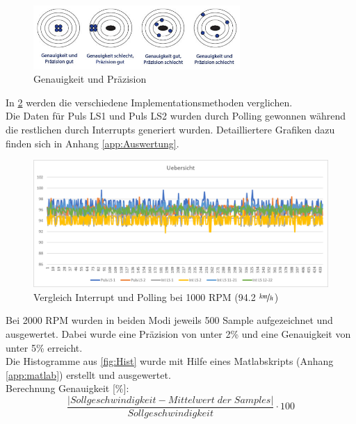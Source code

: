 \begin{figure}[ht]
    \centering
    \includegraphics[width=0.7\textwidth]{images/testingtips}
    \caption{Genauigkeit und Präzision}
    \label{fig:GenauPraz}
\end{figure}
\clearpage

In \ref{fig:AuswertungInt}  werden die verschiedene Implementationsmethoden verglichen.\\

Die Daten für Puls LS1 und Puls LS2 wurden durch Polling gewonnen während die restlichen durch Interrupts generiert wurden. Detailliertere Grafiken dazu finden sich in Anhang \ref{app:Auswertung}.
\begin{figure}[ht]
    \centering
    	\includegraphics[width=\textwidth]{images/auswertungInt.png}
    \caption{Vergleich Interrupt und Polling bei 1000 RPM (94.2 $\nicefrac{km}{h}$)}
    \label{fig:AuswertungInt}
\end{figure}


Bei 2000 RPM wurden in beiden Modi jeweils 500 Sample aufgezeichnet und ausgewertet. Dabei wurde eine Präzision von unter 2\% und eine Genauigkeit von unter 5\% erreicht.\\
Die Histogramme aus \ref{fig:Hist} wurde mit Hilfe eines Matlabskripts (Anhang \ref{app:matlab}) erstellt und ausgewertet.\\

Berechnung Genauigkeit [\%]:
\[ \frac{|Sollgeschwindigkeit - Mittelwert\;der \; Samples|}{Sollgeschwindigkeit}\cdot 100 \]


